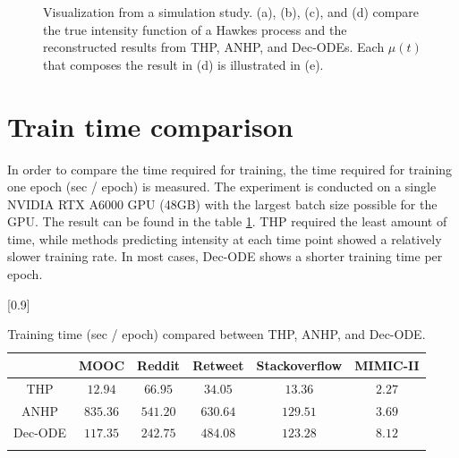\begin{figure}[h]
    \caption{Visualization from a simulation study. (a), (b), (c), and (d) compare the true intensity function of a Hawkes process and the reconstructed results from THP, ANHP, and Dec-ODEs. Each $\mu(t)$ that composes the result in (d) is illustrated in (e).}
    \label{fig:simulation}
\end{figure}



\section{Train time comparison}

In order to compare the time required for training, the time required for training one epoch (sec / epoch) is measured. The experiment is conducted on a single NVIDIA RTX A6000 GPU (48GB) with the largest batch size possible for the GPU. The result can be found in the table \ref{tab:epoch_time}. THP required the least amount of time, while methods predicting intensity at each time point showed a relatively slower training rate. In most cases, Dec-ODE shows a shorter training time per epoch.
\begin{table}[h]
    \renewcommand{\arraystretch}{1.1}
    \centering
    \caption{Training time (sec / epoch) compared between THP, ANHP, and Dec-ODE.}
    \scalebox{0.9}[0.9]{
    \begin{tabular}{c| c| c | c | c | c } \Xhline{0.3ex}
    & \multicolumn{1}{c|}{MOOC} & \multicolumn{1}{c|}{Reddit} & \multicolumn{1}{c|}{Retweet} & \multicolumn{1}{c|}{Stackoverflow} & \multicolumn{1}{c}{MIMIC-II}\\[-2pt]
    \hline
    THP & $12.94$ & $66.95$ & $34.05$ & $13.36$ & $2.27$ \\
    ANHP & $835.36$ & $541.20$ & $630.64$ &$129.51$ & $3.69$ \\
    Dec-ODE & $117.35$ & $242.75$ & $484.08$ & $123.28$ & $8.12$\\
        
    \Xhline{0.3ex}      
    \end{tabular}
    }
        \label{tab:epoch_time}
    
    \end{table}
    
